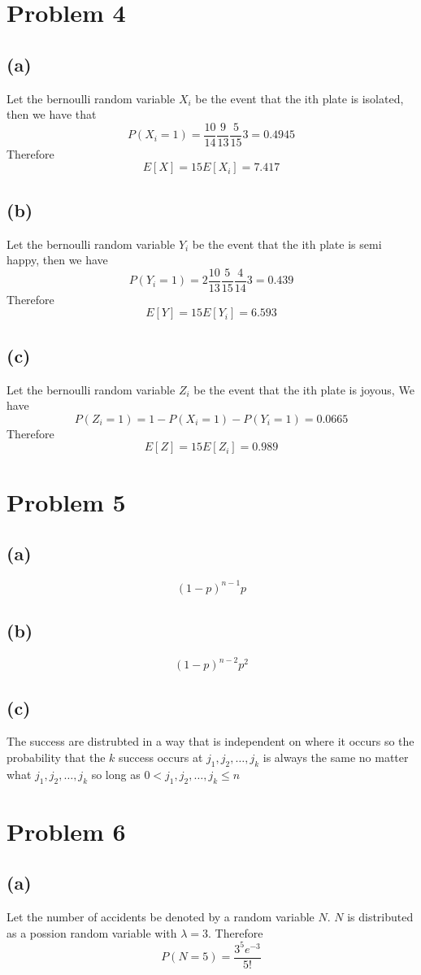 \section*{Problem 4}
\subsection*{(a)}
Let the bernoulli random variable $X_i$ be the event 
that the ith plate is isolated, then we have that 
$$P(X_i=1)=\frac{10}{14}\frac{9}{13}\frac{5}{15}3=0.4945$$
Therefore 
$$E[X]=15E[X_i]=\boxed{7.417}$$
\subsection*{(b)}
Let the bernoulli random variable $Y_i$ be the event
that the ith plate is semi happy, then we have
$$P(Y_i=1)=2\frac{10}{13}\frac{5}{15}\frac{4}{14}3=0.439$$
Therefore
$$E[Y]=15E[Y_i]=\boxed{6.593}$$
\subsection*{(c)}
Let the bernoulli random variable $Z_i$ be the event
that the ith plate is joyous, We have
$$P(Z_i=1)=1-P(X_i=1)-P(Y_i=1)=0.0665$$
Therefore
$$E[Z]=15E[Z_i]=\boxed{0.989}$$
\section*{Problem 5}
\subsection*{(a)}
$$\boxed{(1-p)^{n-1}p}$$
\subsection*{(b)}
$$\boxed{(1-p)^{n-2}p^2}$$
\subsection*{(c)}
The success are distrubted in a way that
is independent on where it occurs so 
the probability that the $k$ success occurs at 
$j_1,j_2,\dots,j_k$ is always the same no matter what
$j_1,j_2,\dots,j_k$ so long as $0<j_1,j_2,\dots,j_k\leq n$
\section*{Problem 6}
\subsection*{(a)}
Let the number of accidents be denoted by a random variable
$N$. $N$ is distributed as a possion random variable with
$\lambda=3$. Therefore
$$P(N=5)=\boxed{\frac{3^5e^{-3}}{5!}}$$
